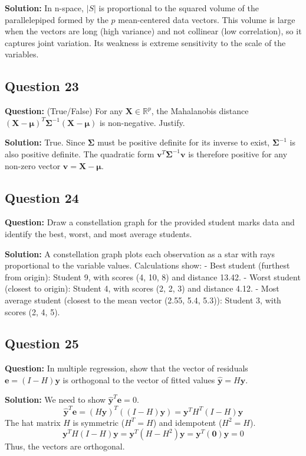 \textbf{Solution:}
In n-space, $|S|$ is proportional to the squared volume of the parallelepiped formed by the $p$ mean-centered data vectors. This volume is large when the vectors are long (high variance) and not collinear (low correlation), so it captures joint variation. Its weakness is extreme sensitivity to the scale of the variables.

\subsection*{Question 23}
\textbf{Question:} (True/False) For any $\mathbf{X} \in \mathbb{R}^p$, the Mahalanobis distance $(\mathbf{X} - \boldsymbol{\mu})^T \boldsymbol{\Sigma}^{-1} (\mathbf{X} - \boldsymbol{\mu})$ is non-negative. Justify.

\textbf{Solution:}
True. Since $\boldsymbol{\Sigma}$ must be positive definite for its inverse to exist, $\boldsymbol{\Sigma}^{-1}$ is also positive definite. The quadratic form $\mathbf{v}^T \boldsymbol{\Sigma}^{-1} \mathbf{v}$ is therefore positive for any non-zero vector $\mathbf{v} = \mathbf{X} - \boldsymbol{\mu}$.

\subsection*{Question 24}
\textbf{Question:} Draw a constellation graph for the provided student marks data and identify the best, worst, and most average students.

\textbf{Solution:}
A constellation graph plots each observation as a star with rays proportional to the variable values.
Calculations show:
- Best student (furthest from origin): Student 9, with scores (4, 10, 8) and distance 13.42.
- Worst student (closest to origin): Student 4, with scores (2, 2, 3) and distance 4.12.
- Most average student (closest to the mean vector (2.55, 5.4, 5.3)): Student 3, with scores (2, 4, 5).

\subsection*{Question 25}
\textbf{Question:} In multiple regression, show that the vector of residuals $\mathbf{e} = (I-H)\mathbf{y}$ is orthogonal to the vector of fitted values $\hat{\mathbf{y}} = H\mathbf{y}$.

\textbf{Solution:}
We need to show $\hat{\mathbf{y}}^T \mathbf{e} = 0$.
$$ \hat{\mathbf{y}}^T \mathbf{e} = (H\mathbf{y})^T ((I-H)\mathbf{y}) = \mathbf{y}^T H^T (I-H) \mathbf{y} $$
The hat matrix $H$ is symmetric ($H^T=H$) and idempotent ($H^2=H$).
$$ \mathbf{y}^T H (I-H) \mathbf{y} = \mathbf{y}^T (H - H^2) \mathbf{y} = \mathbf{y}^T (\mathbf{0}) \mathbf{y} = 0 $$
Thus, the vectors are orthogonal.
